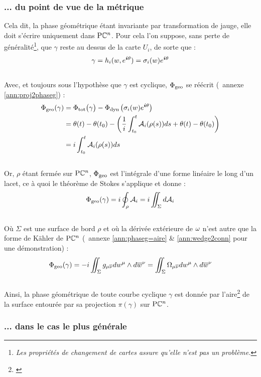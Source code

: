 \subsubsection{... du point de vue de la métrique} \label{subsec:phase_g2aire}

Cela dit, la phase géométrique étant invariante par transformation de jauge, elle doit s'écrire uniquement dans $\text{\normalfont P}\mathbb{C}^{n}$. Pour cela l'on suppose, sans perte de généralité\footnote{\itshape 
	Les propriétés de changement de cartes assure qu'elle n'est pas un problème.
}, que $\gamma$ reste au dessus de la carte $U_i$, de sorte que :
\[\gamma = h_i(w, e^{\boldsymbol{i} \theta}) = \sigma_i(w) e^{\boldsymbol{i} \theta}\]
\\
Avec, et toujours sous l'hypothèse que $\gamma$ est cyclique, $\Phi_{\text{\normalfont geo}}$ se réécrit (\cf~annexe \ref{ann:proj2phaseg}) :
\begin{align*}
	\Phi_{\text{\normalfont geo}}(\gamma) &= \Phi_{\text{\normalfont tot}}\big( \gamma \big) - \Phi_{\text{\normalfont dyn}\, }\big( \sigma_i(w) e^{\boldsymbol{i} \theta} \big) \\
	&= \theta(t) - \theta(t_0) - \left( \frac{1}{i}\int_{t_0}^t \mathcal{A}_i(\rho(s)) ds + \theta(t) - \theta(t_0) \right) \\
	&= i \int_{t_0}^t \mathcal{A}_i(\rho(s)) ds
\end{align*}
\\
Or, $\rho$ étant fermée sur $\text{\normalfont P}\mathbb{C}^{n}$, $\Phi_{\text{\normalfont geo}}$ est l'intégrale d'une forme linéaire le long d'un lacet, ce à quoi le théorème de Stokes s'applique et donne :
\[\Phi_{\text{\normalfont geo}}(\gamma) = i\oint_\rho \mathcal{A}_i = i\iint_\Sigma d \mathcal{A}_i\]
\\
Où $\Sigma$ est une surface de bord $\rho$ et où la dérivée extérieure de $\omega$ n'est autre que la forme de Kähler de $\text{\normalfont P}\mathbb{C}^{n}$ (\cf~annexe \ref{ann:phaseg=aire} \& \ref{ann:wedge2conn} pour une démonstration) :
\begin{equation} \label{eq:phaseg-aire2PC^n}
	\Phi_{\text{\normalfont geo}}(\gamma) = -i\iint_\Sigma g_{\mu \overline{\nu}} dw^\mu \wedge d\overline{w}^\nu = \iint_{\Sigma} \Omega_{\mu\overline{\nu}} dw^\mu\wedge d\overline{w}^\nu 
\end{equation}
\\
Ainsi, la phase géométrique de toute courbe cyclique $\gamma$ est donnée par l'aire\footnote{\itshape
	}
de la surface entourée par sa projection $\pi(\gamma)$ sur $\text{\normalfont P}\mathbb{C}^{n}$.
\skipl



\subsubsection{\wip ... dans le cas le plus générale} \label{subsec:phase_g2geode}

